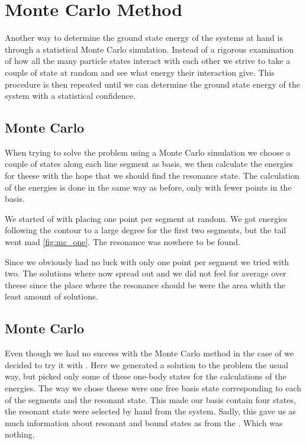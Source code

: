 \chapter{Monte Carlo Method}
\label{cha:monte_carlo}

Another way to determine the ground state energy of the systems at hand is through a statistical Monte Carlo simulation. 
Instead of a rigorous examination of how all the many particle states interact with each other we strive to take a couple of state at random and see what energy their interaction give. 
This procedure is then repeated until we can determine the ground state energy of the system with a statistical confidence.

\section{Monte Carlo }
When trying to solve the  problem using a Monte Carlo simulation we choose a couple of states along each line segment as basis, we then calculate the energies for theese with the hope that we should find the resonance state.
The calculation of the energies is done in the same way as before, only with fewer points in the basis.

We started of with placing one point per segment at random.
We got energies following the contour to a large degree for the first two segments, but the tail went mad \cref{fig:mc_one}.
The resonance was nowhere to be found.

Since we obviously had no luck with only one point per segment we tried with two.
The solutions where now spread out and we did not feel for average over theese since the place where the resonance should be were the area whith the least amount of solutions.

\section{Monte Carlo }
Even though we had no success with the Monte Carlo method in the case of  we decided to try it with .
Here we generated a solution to the  problem the usual way, but picked only some of these one-body states for the calculations of the energies.
The way we chose theese were one free basis state corresponding to each of the segments and the resonant state.
This made our basis contain four states, the resonant state were selected by hand from the  system.
Sadly, this gave us as much information about resonant and bound states as from the .
Which was nothing.

